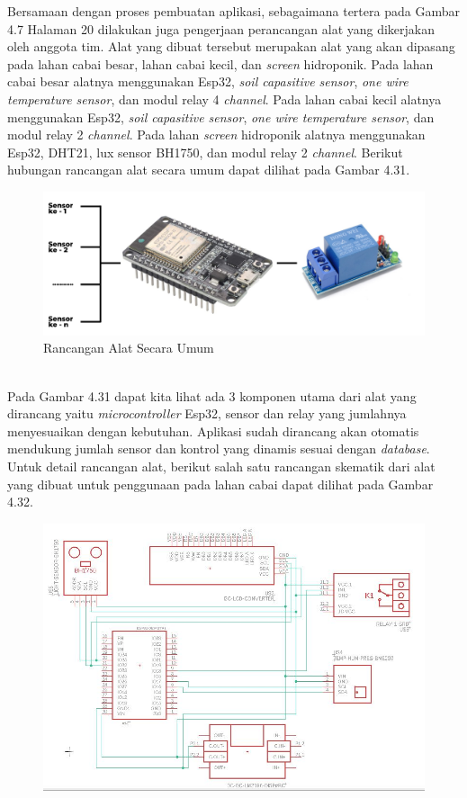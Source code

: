 \begin{flushleft}
\begin{justify}
\begin{enumerate}
\begin{itemize}
            \end{itemize}
        \end{enumerate}
        Bersamaan dengan proses pembuatan aplikasi, sebagaimana tertera pada Gambar 4.7 Halaman 20 
        dilakukan juga pengerjaan perancangan alat yang dikerjakan oleh anggota tim. Alat yang dibuat tersebut merupakan alat
        yang akan dipasang pada lahan cabai besar, lahan cabai kecil, dan \emph{screen} hidroponik. 
        Pada lahan cabai besar alatnya menggunakan Esp32, \emph{soil capasitive sensor}, \emph{one wire temperature sensor}, dan modul relay 4 \emph{channel}.
        Pada lahan cabai kecil alatnya menggunakan Esp32, \emph{soil capasitive sensor}, \emph{one wire temperature sensor}, dan modul relay 2 \emph{channel}.
        Pada lahan \emph{screen} hidroponik alatnya menggunakan Esp32, DHT21, lux sensor BH1750, dan modul relay 2 \emph{channel}. 
        Berikut hubungan rancangan alat secara umum dapat dilihat pada Gambar 4.31.
        \begin{figure}[ht]
            \centering
            \includegraphics[width=12cm]{images/bab 4/alats.png}
            \caption{Rancangan Alat Secara Umum}
        \end{figure}
        \\Pada Gambar 4.31 dapat kita lihat ada 3 komponen utama dari alat yang dirancang yaitu 
        \emph{microcontroller} Esp32, sensor dan relay yang jumlahnya menyesuaikan dengan kebutuhan. 
        Aplikasi sudah dirancang akan otomatis mendukung jumlah sensor dan kontrol yang dinamis sesuai dengan 
        \emph{database}. Untuk detail rancangan alat, berikut salah satu rancangan skematik dari alat yang 
        dibuat untuk penggunaan pada lahan cabai dapat dilihat pada Gambar 4.32.
        \begin{figure}[ht]
            \centering
            \includegraphics[width=12cm]{images/bab 4/Modul Ruangan.JPG}

\end{figure}
\end{justify}
\end{flushleft}
